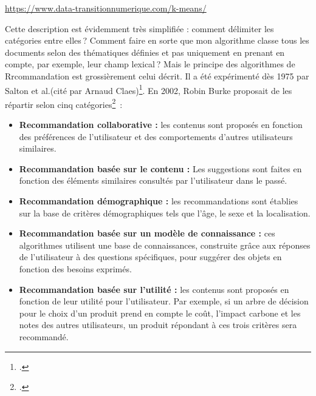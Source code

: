 \begin{center}
	\url{https://www.data-transitionnumerique.com/k-means/}   
\end{center}

Cette description est évidemment très simplifiée : comment délimiter les catégories entre elles ? Comment faire en sorte que mon algorithme classe tous les documents selon des thématiques définies et pas uniquement en prenant en compte, par exemple, leur champ lexical ? Mais le principe des algorithmes de Rrcommandation est grossièrement celui décrit. Il a été expérimenté dès 1975 par Salton et al.(cité par Arnaud Claes)\footcite[p. 38]{claes2022}. En 2002, Robin Burke proposait de les répartir selon cinq catégories\footcite{claes2022} :

\begin{itemize}
	\item \textbf{Recommandation collaborative :} les contenus sont proposés en fonction des préférences de l’utilisateur et des comportements d’autres utilisateurs similaires.
	\item \textbf{Recommandation basée sur le contenu :} Les suggestions sont faites en fonction des éléments similaires consultés par l’utilisateur dans le passé.
	\item \textbf{Recommandation démographique :} les recommandations sont établies sur la base de critères démographiques tels que l’âge, le sexe et la localisation.
	\item \textbf{Recommandation basée sur un modèle de connaissance :} ces algorithmes utilisent une base de connaissances, construite grâce aux réponses de l’utilisateur à des questions spécifiques, pour suggérer des objets en fonction des besoins exprimés.
	\item \textbf{Recommandation basée sur l’utilité : }les contenus sont proposés en fonction de leur utilité pour l’utilisateur. Par exemple, si un arbre de décision pour le choix d’un produit prend en compte le coût, l’impact carbone et les notes des autres utilisateurs, un produit répondant à ces trois critères sera recommandé.
\end{itemize}

